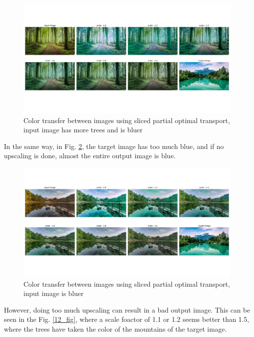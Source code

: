 \documentclass[a4paper,12pt]{article}
\begin{document}
\begin{figure}[H]
\includegraphics[trim=0cm 3cm 0cm 1.5cm, width = \columnwidth]{landscape41.pdf}
\caption{Color transfer between images using sliced partial optimal transport, input image has more trees and is bluer}\label{41_fig}
\end{figure}

In the same way, in Fig. \ref{21_fig}, the target image has too much blue, and if no upscaling is done, almost the entire output image is blue.

\begin{figure}[H]
\includegraphics[trim=0cm 3cm 0cm 1.5cm, width = \columnwidth]{landscape21.pdf}
\caption{Color transfer between images using sliced partial optimal transport, input image is bluer}\label{21_fig}
\end{figure}

However, doing too much upscaling can result in a bad output image. This can be seen in the Fig. \ref{12_fig}, where a scale foactor of 1.1 or 1.2 seems better than 1.5, where the trees have taken the color of the mountains of the target image.
\end{document}

